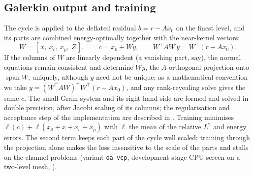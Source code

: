 \subsection{Galerkin output and training}\label{sec:output}
The cycle is applied to the deflated residual $b = r - Ax_0$ on the finest level, and its parts are combined
energy-optimally together with the near-kernel vectors:
\begin{equation}\label{eq:projection}
  W = [\,x,\ x_c,\ x_p,\ Z\,], \qquad c = x_0 + W y, \qquad W^\top A W\, y = W^\top (r - A x_0).
\end{equation}
If the columns of $W$ are linearly dependent (a vanishing part, say), the normal equations remain consistent and
determine $Wy$, the $A$-orthogonal projection onto $\operatorname{span}W$, uniquely, although $y$ need not be unique; as a
mathematical convention we take $y = (W^\top AW)^{+}W^\top(r - Ax_0)$, and any rank-revealing solve gives the same $c$. The small
Gram system and its right-hand side are formed and solved in double precision, after Jacobi scaling of its columns; the
regularisation and acceptance step of the implementation are described in . Training minimises
$\ell(c) + \ell(x_0 + x + x_c + x_p)$ with $\ell$ the mean of the relative $L^2$ and energy errors. The second term keeps
each part of the cycle well scaled; training through the projection alone makes the loss insensitive to the scale of the
parts and stalls on the channel problems (variant \texttt{oa-vcp}, development-stage CPU screen on a two-level mesh, ).

